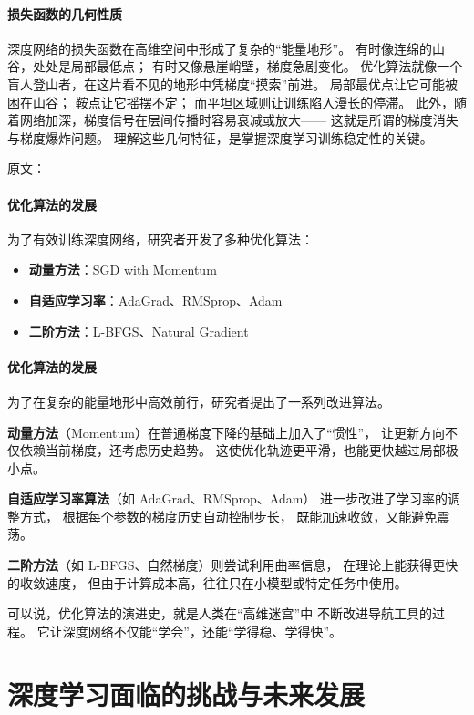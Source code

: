 \paragraph{损失函数的几何性质}  
深度网络的损失函数在高维空间中形成了复杂的“能量地形”。  
有时像连绵的山谷，处处是局部最低点；  
有时又像悬崖峭壁，梯度急剧变化。  
优化算法就像一个盲人登山者，在这片看不见的地形中凭梯度“摸索”前进。  
局部最优点让它可能被困在山谷；  
鞍点让它摇摆不定；  
而平坦区域则让训练陷入漫长的停滞。  
此外，随着网络加深，梯度信号在层间传播时容易衰减或放大——  
这就是所谓的梯度消失与梯度爆炸问题。  
理解这些几何特征，是掌握深度学习训练稳定性的关键。

原文：
\paragraph{优化算法的发展}
为了有效训练深度网络，研究者开发了多种优化算法：
\begin{itemize}
\item {\bf 动量方法}：SGD with Momentum
\item {\bf 自适应学习率}：AdaGrad、RMSprop、Adam
\item {\bf 二阶方法}：L-BFGS、Natural Gradient
\end{itemize}
\paragraph{优化算法的发展}  
为了在复杂的能量地形中高效前行，研究者提出了一系列改进算法。  

{\bf 动量方法}（Momentum）在普通梯度下降的基础上加入了“惯性”，  
让更新方向不仅依赖当前梯度，还考虑历史趋势。  
这使优化轨迹更平滑，也能更快越过局部极小点。  

{\bf 自适应学习率算法}（如 AdaGrad、RMSprop、Adam）  
进一步改进了学习率的调整方式，  
根据每个参数的梯度历史自动控制步长，  
既能加速收敛，又能避免震荡。  

{\bf 二阶方法}（如 L-BFGS、自然梯度）则尝试利用曲率信息，  
在理论上能获得更快的收敛速度，  
但由于计算成本高，往往只在小模型或特定任务中使用。  

可以说，优化算法的演进史，就是人类在“高维迷宫”中  
不断改进导航工具的过程。  
它让深度网络不仅能“学会”，还能“学得稳、学得快”。

\section{深度学习面临的挑战与未来发展}

